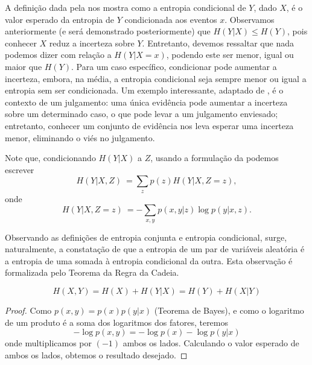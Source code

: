 A definição dada pela  nos mostra como a entropia
condicional de $Y$, dado $X$, é o valor esperado da entropia de $Y$
condicionada aos eventos $x$.  Observamos anteriormente (e será demonstrado
posteriormente) que $H(Y|X) \leq H(Y)$, pois conhecer $X$ reduz a incerteza
sobre $Y$. Entretanto, devemos ressaltar que nada podemos dizer com relação a
$H(Y|X=x)$, podendo este ser menor, igual ou maior que $H(Y)$. Para um caso
específico, condicionar pode aumentar a incerteza, embora, na média, a entropia
condicional seja sempre menor ou igual a entropia sem ser condicionada. Um
exemplo interessante, adaptado de \textcite{cover2006}, é o contexto de um
julgamento: uma única evidência pode aumentar a incerteza sobre um
determinado caso, o que pode levar a um julgamento enviesado; entretanto,
conhecer um conjunto de evidência nos leva esperar uma incerteza menor,
eliminando o viés no julgamento.

Note que, condicionando $H(Y|X)$ a $Z$, usando a formulação da  podemos
escrever
\begin{equation}\label{eq:entcondeventsZ}
H(Y|X,Z) \: = \sum_z p(z) H(Y|X,Z=z),
\end{equation}
onde 
\begin{equation}\label{eq:entcondeventsZz}
H(Y|X,Z=z) \: = -\sum_{x,y} p(x,y|z) \log p(y|x,z) .
\end{equation}

Observando as definições de entropia conjunta e entropia condicional, surge, naturalmente,
a constatação de que a entropia de um par de variáveis aleatória é a entropia de uma
somada à entropia condicional da outra. Esta observação é formalizada pelo Teorema
da Regra da Cadeia.

\begin{theorem}\label{thm:regracadeia}
 \begin{equation}
  H(X,Y) = H(X) + H(Y|X) = H(Y) + H(X|Y)
 \end{equation}
\end{theorem}
\begin{proof}
 Como $p(x,y) = p(x) p(y|x)$ (Teorema de Bayes), e como o logaritmo de um produto é a soma 
 dos logaritmos dos fatores, teremos
 \begin{equation}
 - \log p(x,y) = - \log p(x) - \log p(y|x)
 \end{equation}
 onde multiplicamos por $(-1)$ ambos os lados.
 Calculando o valor esperado de ambos os lados, obtemos o resultado desejado.
\end{proof}



